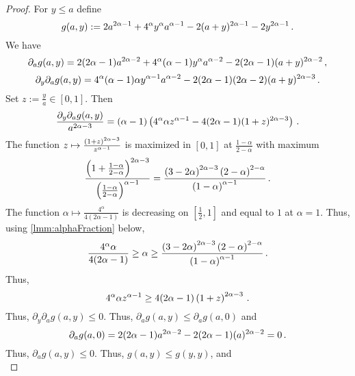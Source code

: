 \begin{proof}
	For $y\leq a$ define
	\begin{equation*}
		g(a,y) := 2a^{2\alpha-1} + 4^\alpha y^\alpha a^{\alpha-1} - 2(a+y)^{2\alpha-1} - 2y^{2\alpha-1}
		\, .
	\end{equation*}
	We have
	\begin{equation*}
		\partial_a g(a,y) = 2(2\alpha-1)a^{2\alpha-2} + 4^\alpha(\alpha-1) y^\alpha a^{\alpha-2} - 2(2\alpha-1)(a+y)^{2\alpha-2}
		\, ,
	\end{equation*}
	\begin{equation*}
		\partial_y \partial_a g(a,y) = 4^\alpha (\alpha-1) \alpha y^{\alpha-1} a^{\alpha-2} - 2(2\alpha-1)(2\alpha-2)(a+y)^{2\alpha-3}
		\, .
	\end{equation*}
	Set $z := \frac{y}{a} \in[0,1]$. Then
	\begin{equation*}
	 \frac{\partial_y \partial_a g(a,y)}{a^{2\alpha-3}} =  (\alpha-1) \left( 4^\alpha \alpha z^{\alpha-1} - 4(2\alpha-1)(1+z)^{2\alpha-3} \right)
	 \, .
	\end{equation*}
	The function $z \mapsto \frac{\left( 1+z \right)^{2\alpha-3}}{z^{\alpha-1}}$ is maximized in $[0,1]$ at $\frac{1-\alpha}{2-\alpha}$ with maximum 
	\begin{equation*}
		\frac{\left( 1+\frac{1-\alpha}{2-\alpha} \right)^{2\alpha-3}}{\left( \frac{1-\alpha}{2-\alpha} \right)^{\alpha-1}}
		=
		\frac{\left( 3-2\alpha \right)^{2\alpha-3} \left( 2-\alpha \right)^{2-\alpha}}{\left( 1-\alpha \right)^{\alpha-1}} 
		\, .
	\end{equation*}
	The function $\alpha\mapsto \frac{4^\alpha}{4(2\alpha-1)}$ is decreasing on $[\frac12, 1]$ and equal to $1$ at $\alpha=1$. 
	Thus, using \autoref{lmm:alphaFraction} below, 
	\begin{equation*}
		\frac{4^\alpha \alpha}{4(2\alpha-1)} \geq \alpha \geq \frac{\left( 3-2\alpha \right)^{2\alpha-3} \left( 2-\alpha \right)^{2-\alpha}}{\left( 1-\alpha \right)^{\alpha-1}} 
		\, .
	\end{equation*}
	Thus,
	\begin{equation*}
		4^\alpha \alpha z^{\alpha-1} \geq 4(2\alpha-1) \left( 1+z \right)^{2\alpha-3}
		\, .
	\end{equation*}
	Thus, $\partial_y \partial_a g(a,y) \leq 0$. Thus, $\partial_a g(a,y) \leq \partial_a g(a,0)$ and
	\begin{equation*}
		\partial_a  g(a,0) = 2(2\alpha-1)a^{2\alpha-2} - 2(2\alpha-1)(a)^{2\alpha-2} = 0
		\, .
	\end{equation*}
	Thus, $\partial_a g(a,y) \leq 0$. Thus, $g(a,y) \leq g(y,y)$, and
	\begin{equation*}

\end{equation*}
\end{proof}
